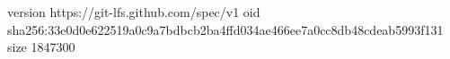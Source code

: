 version https://git-lfs.github.com/spec/v1
oid sha256:33e0d0e622519a0c9a7bdbcb2ba4ffd034ae466ee7a0cc8db48cdeab5993f131
size 1847300
